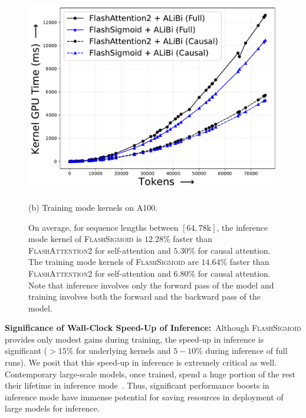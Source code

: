 \begin{figure}[!htbp]
\begin{minipage}{0.46\textwidth}
        \includegraphics[trim={0 0 0 0}, width=\textwidth]{figures/_flash_figures/final_arxiv/f4/a100/A100_alibi_FWDBWD_Full_14.64_0.08_Causal_6.8_0.03.pdf}
        \captionsetup{justification=centering} 
        \caption*{
            (b) Training mode kernels on A100. 
        }
    \end{minipage}
    \caption{
        On average, for sequence lengths between $[64, 78\mathrm{k}]$, the inference mode kernel of \textsc{FlashSigmoid} is ${12.28}\%$ faster than \textsc{FlashAttention2} for self-attention and ${5.30}\%$ for causal attention.
        The training mode kernels of \textsc{FlashSigmoid} are ${14.64}\%$ faster than \textsc{FlashAttention2} for self-attention and ${6.80}\%$ for causal attention.
        Note that inference involves only the forward pass of the model and training involves both the forward and the backward pass of the model.
    }
    \label{fig:a100-softmax_alibi-sigmoid_alibi-fwd_bwd}
\end{figure}


\noindent\textbf{Significance of Wall-Clock Speed-Up of Inference:}\ Although \textsc{FlashSigmoid} provides only modest gains during training, the speed-up in inference is significant ($> 15\%$ for underlying kernels and $5-10\%$ during inference of full runs).
We posit that this speed-up in inference is extremely critical as well.
Contemporary large-scale models, once trained, spend a huge portion of the rest their lifetime in inference mode~\citep{DBLP:journals/corr/abs-2303-08774}. 
Thus, significant performance boosts in inference mode have immense potential for saving resources in deployment of large models for inference. 

